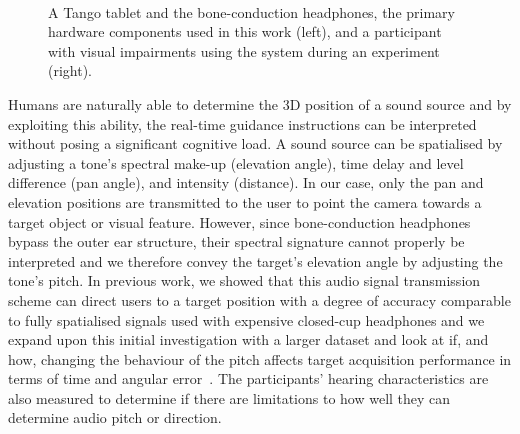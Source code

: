 \documentclass[acmsmall]{acmart}
\begin{document}
\begin{figure}
  \centering
~
  \caption{A Tango tablet and the bone-conduction headphones, the primary hardware components used in this work (left), and a participant with visual impairments using the system during an experiment (right).}
\end{figure}

Humans are naturally able to determine the 3D position of a sound source and by exploiting this ability, the real-time guidance instructions can be interpreted without posing a significant cognitive load.
A sound source can be spatialised by adjusting a tone's spectral make-up (elevation angle), time delay and level difference (pan angle), and intensity (distance).
In our case, only the pan and elevation positions are transmitted to the user to point the camera towards a target object or visual feature.
However, since bone-conduction headphones bypass the outer ear structure, their spectral signature cannot properly be interpreted and we therefore convey the target's elevation angle by adjusting the tone's pitch.
In previous work, we showed that this audio signal transmission scheme can direct users to a target position with a degree of accuracy comparable to fully spatialised signals used with expensive closed-cup headphones and we expand upon this initial investigation with a larger dataset and look at if, and how, changing the behaviour of the pitch affects target acquisition performance in terms of time and angular error~\citep{lock2019bone,macdonald2006spatial}.
The participants' hearing characteristics are also measured to determine if there are limitations to how well they can determine audio pitch or direction. 
\end{document}

